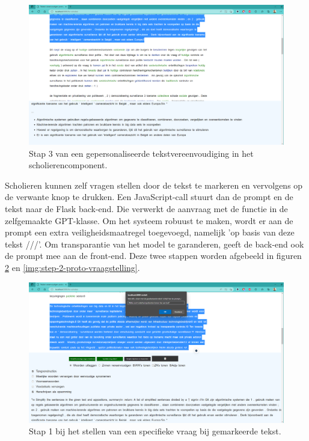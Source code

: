 \begin{center}
	\begin{figure}[H]
		\includegraphics[width=\linewidth]{img/proto-opsomming-3.png}
		\caption{Stap 3 van een gepersonaliseerde tekstvereenvoudiging in het scholierencomponent.}
		\label{img:proto-scholieren-step-3}
	\end{figure}
\end{center}

Scholieren kunnen zelf vragen stellen door de tekst te markeren en vervolgens op de verwante knop te drukken. Een JavaScript-call stuurt dan de prompt en de tekst naar de Flask back-end. Die verwerkt de aanvraag met de functie in de zelfgemaakte GPT-klasse. Om het systeem robuust te maken, wordt er aan de prompt een extra veiligheidsmaatregel toegevoegd, namelijk 'op basis van deze tekst ///'. Om transparantie van het model te garanderen, geeft de back-end ook de prompt mee aan de front-end. Deze twee stappen worden afgebeeld in figuren \ref{img:step-1-proto-vraagstelling} en \ref{img:step-2-proto-vraagstelling}.

\begin{center}
	\begin{figure}
		\includegraphics[width=\linewidth]{img/proto-vraagstelling-1.png}
		\caption{Stap 1 bij het stellen van een specifieke vraag bij gemarkeerde tekst.}
		\label{img:step-1-proto-vraagstelling}
	\end{figure}
\end{center}


